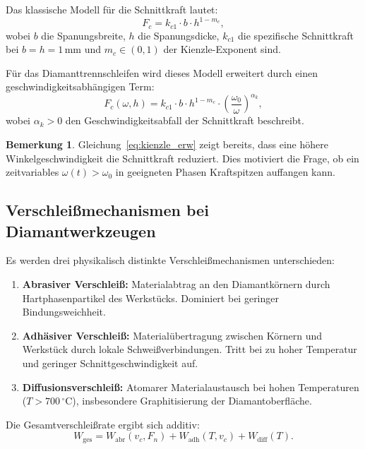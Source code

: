 ﻿\documentclass[a4paper,12pt]{article}
\theoremstyle{definition}
\newtheorem{bemerkung}{Bemerkung}
\begin{document}
Das klassische Modell für die Schnittkraft lautet:
\[
F_c = k_{c1} \cdot b \cdot h^{1 - m_c},
\]
wobei $b$ die Spanungsbreite, $h$ die Spanungsdicke, $k_{c1}$ die spezifische
Schnittkraft bei $b = h = 1\,\mathrm{mm}$ und $m_c \in (0,1)$ der Kienzle-Exponent sind.

Für das Diamanttrennschleifen wird dieses Modell erweitert durch einen
geschwindigkeitsabhängigen Term:
\begin{equation}
\label{eq:kienzle_erw}
F_c(\omega, h) = k_{c1} \cdot b \cdot h^{1-m_c} \cdot \left(\frac{\omega_0}{\omega}\right)^{\alpha_k},
\end{equation}
wobei $\alpha_k > 0$ den Geschwindigkeitsabfall der Schnittkraft beschreibt.

\begin{bemerkung}
Gleichung~\eqref{eq:kienzle_erw} zeigt bereits, dass eine höhere Winkelgeschwindigkeit
die Schnittkraft reduziert. Dies motiviert die Frage, ob ein zeitvariables $\omega(t) > \omega_0$
in geeigneten Phasen Kraftspitzen auffangen kann.
\end{bemerkung}

\subsection{Verschleißmechanismen bei Diamantwerkzeugen}

Es werden drei physikalisch distinkte Verschleißmechanismen unterschieden:

\begin{enumerate}
\item \textbf{Abrasiver Verschleiß:} Materialabtrag an den Diamantkörnern durch
      Hartphasenpartikel des Werkstücks. Dominiert bei geringer Bindungsweichheit.
\item \textbf{Adhäsiver Verschleiß:} Materialübertragung zwischen Körnern und Werkstück
      durch lokale Schweißverbindungen. Tritt bei zu hoher Temperatur und geringer
      Schnittgeschwindigkeit auf.
\item \textbf{Diffusionsverschleiß:} Atomarer Materialaustausch bei hohen Temperaturen
      ($T > 700\,^\circ\mathrm{C}$), insbesondere Graphitisierung der Diamantoberfläche.
\end{enumerate}

Die Gesamtverschleißrate ergibt sich additiv:
\begin{equation}
\label{eq:verschleiss_gesamt}
W_{\mathrm{ges}} = W_{\mathrm{abr}}(v_c, F_n) + W_{\mathrm{adh}}(T, v_c) + W_{\mathrm{diff}}(T).
\end{equation}
\end{document}
